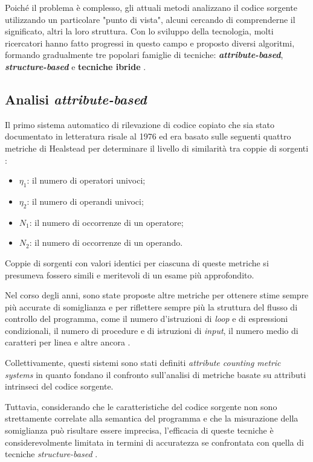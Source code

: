 Poiché il problema è complesso, gli attuali metodi analizzano il codice sorgente utilizzando un particolare "punto di vista", alcuni cercando di comprenderne il significato, altri la loro struttura.
%
Con lo sviluppo della tecnologia, molti ricercatori hanno fatto progressi in questo campo e proposto diversi algoritmi, formando gradualmente tre popolari famiglie di tecniche: \textbf{\textit{attribute-based}}, \textbf{\textit{structure-based}} e \textbf{tecniche ibride} \cite{es-plag}.

\subsection{Analisi \textit{attribute-based}}
Il primo sistema automatico di rilevazione di codice copiato che sia stato documentato in letteratura risale al 1976 \cite{ottenstein} ed era basato sulle seguenti quattro metriche di Healstead per determinare il livello di similarità tra coppie di sorgenti \cite{halstead}:

\begin{itemize}
    \item $\eta_1$: il numero di operatori univoci;
    \item $\eta_2$: il numero di operandi univoci;
    \item $N_1$: il numero di occorrenze di un operatore;
    \item $N_2$: il numero di occorrenze di un operando.
\end{itemize}

Coppie di sorgenti con valori identici per ciascuna di queste metriche si presumeva fossero simili e meritevoli di un esame più approfondito.

Nel corso degli anni, sono state proposte altre metriche per ottenere stime sempre più accurate di somiglianza e per riflettere sempre più la struttura del flusso di controllo del programma, come il numero d'istruzioni di \textit{loop} e di espressioni condizionali, il numero di procedure e di istruzioni di \textit{input}, il numero medio di caratteri per linea e altre ancora \cite{pdectet}.

Collettivamente, questi sistemi sono stati definiti \textit{attribute counting metric systems} in quanto fondano il confronto sull'analisi di metriche basate su attributi intrinseci del codice sorgente.

Tuttavia, considerando che le caratteristiche del codice sorgente non sono strettamente correlate alla semantica del programma e che la misurazione della somiglianza può risultare essere imprecisa, l'efficacia di queste tecniche è considerevolmente limitata in termini di accuratezza se confrontata con quella di tecniche \textit{structure-based} \cite{es-plag}.

